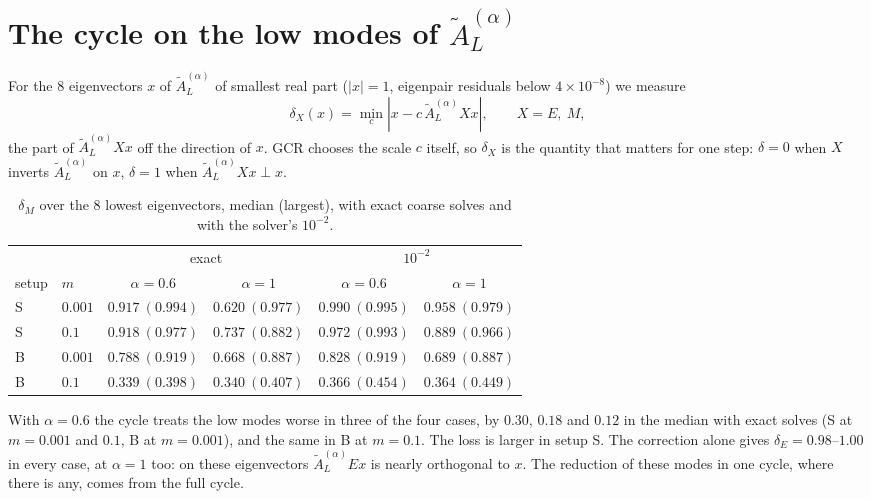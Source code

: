 \documentclass[11pt,a4paper]{article}
\newcommand{\AL}{\tilde A_{L}}
\begin{document}
\section{The cycle on the low modes of \texorpdfstring{$\AL^{(\alpha)}$}{A_L}}
For the 8 eigenvectors $x$ of $\AL^{(\alpha)}$ of smallest real part ($|x|=1$, eigenpair
residuals below $4\times10^{-8}$) we measure
\begin{equation}
\delta_X(x)=\min_c|x-c\,\AL^{(\alpha)}Xx| ,\qquad X=E,\ M,
\end{equation}
the part of $\AL^{(\alpha)}Xx$ off the direction of $x$. GCR chooses the scale $c$ itself, so
$\delta_X$ is the quantity that matters for one step: $\delta=0$ when $X$ inverts
$\AL^{(\alpha)}$ on $x$, $\delta=1$ when $\AL^{(\alpha)}Xx\perp x$.
\begin{table}[h]
\centering
\caption{$\delta_M$ over the 8 lowest eigenvectors, median (largest), with exact coarse
solves and with the solver's $10^{-2}$.}
\label{tab:defect}
\begin{tabular}{@{}llcccc@{}}
\toprule
 & & \multicolumn{2}{c}{exact} & \multicolumn{2}{c}{$10^{-2}$}\\
setup & $m$ & $\alpha=0.6$ & $\alpha=1$ & $\alpha=0.6$ & $\alpha=1$\\
\midrule
S & $0.001$ & $0.917\ (0.994)$ & $0.620\ (0.977)$ & $0.990\ (0.995)$ & $0.958\ (0.979)$\\
S & $0.1$   & $0.918\ (0.977)$ & $0.737\ (0.882)$ & $0.972\ (0.993)$ & $0.889\ (0.966)$\\
B & $0.001$ & $0.788\ (0.919)$ & $0.668\ (0.887)$ & $0.828\ (0.919)$ & $0.689\ (0.887)$\\
B & $0.1$   & $0.339\ (0.398)$ & $0.340\ (0.407)$ & $0.366\ (0.454)$ & $0.364\ (0.449)$\\
\bottomrule
\end{tabular}
\end{table}
With $\alpha=0.6$ the cycle treats the low modes worse in three of the four cases, by
$0.30$, $0.18$ and $0.12$ in the median with exact solves (S at $m=0.001$ and $0.1$, B at
$m=0.001$), and the same in B at $m=0.1$. The loss is larger in setup S. The correction
alone gives $\delta_E=0.98$--$1.00$ in every case, at $\alpha=1$ too: on these eigenvectors
$\AL^{(\alpha)}Ex$ is nearly orthogonal to $x$. The reduction of these modes in one cycle,
where there is any, comes from the full cycle.
\end{document}
